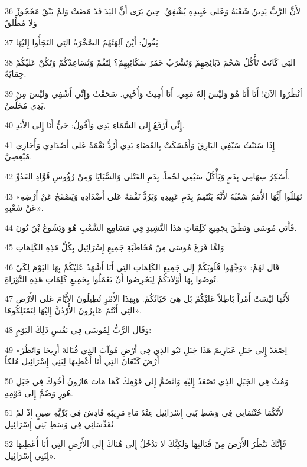 \par 36 لأَنَّ الرَّبَّ يَدِينُ شَعْبَهُ وَعَلى عَبِيدِهِ يُشْفِقُ. حِينَ يَرَى أَنَّ اليَدَ قَدْ مَضَتْ وَلمْ يَبْقَ مَحْجُوزٌ وَلا مُطْلقٌ
\par 37 يَقُولُ: أَيْنَ آلِهَتُهُمُ الصَّخْرَةُ التِي التَجَأُوا إِليْهَا
\par 38 التِي كَانَتْ تَأْكُلُ شَحْمَ ذَبَائِحِهِمْ وَتَشْرَبُ خَمْرَ سَكَائِبِهِمْ؟ لِتَقُمْ وَتُسَاعِدْكُمْ وَتَكُنْ عَليْكُمْ حِمَايَةً.
\par 39 اُنْظُرُوا الآنَ! أَنَا أَنَا هُوَ وَليْسَ إِلهٌ مَعِي. أَنَا أُمِيتُ وَأُحْيِي. سَحَقْتُ وَإِنِّي أَشْفِي وَليْسَ مِنْ يَدِي مُخَلِّصٌ.
\par 40 إِنِّي أَرْفَعُ إِلى السَّمَاءِ يَدِي وَأَقُولُ: حَيٌّ أَنَا إِلى الأَبَدِ.
\par 41 إِذَا سَنَنْتُ سَيْفِي البَارِقَ وَأَمْسَكَتْ بِالقَضَاءِ يَدِي أَرُدُّ نَقْمَةً عَلى أَضْدَادِي وَأُجَازِي مُبْغِضِيَّ.
\par 42 أُسْكِرُ سِهَامِي بِدَمٍ وَيَأْكُلُ سَيْفِي لحْماً. بِدَمِ القَتْلى وَالسَّبَايَا وَمِنْ رُؤُوسِ قُوَّادِ العَدُوِّ.
\par 43 «تَهَللُوا أَيُّهَا الأُمَمُ شَعْبُهُ لأَنَّهُ يَنْتَقِمُ بِدَمِ عَبِيدِهِ وَيَرُدُّ نَقْمَةً عَلى أَضْدَادِهِ وَيَصْفَحُ عَنْ أَرْضِهِ عَنْ شَعْبِهِ».
\par 44 فَأَتَى مُوسَى وَنَطَقَ بِجَمِيعِ كَلِمَاتِ هَذَا النَّشِيدِ فِي مَسَامِعِ الشَّعْبِ هُوَ وَيَشُوعُ بْنُ نُونَ.
\par 45 وَلمَّا فَرَغَ مُوسَى مِنْ مُخَاطَبَةِ جَمِيعِ إِسْرَائِيل بِكُلِّ هَذِهِ الكَلِمَاتِ
\par 46 قَال لهُمْ: «وَجِّهُوا قُلُوبَكُمْ إِلى جَمِيعِ الكَلِمَاتِ التِي أَنَا أَشْهَدُ عَليْكُمْ بِهَا اليَوْمَ لِكَيْ تُوصُوا بِهَا أَوْلادَكُمْ لِيَحْرِصُوا أَنْ يَعْمَلُوا بِجَمِيعِ كَلِمَاتِ هَذِهِ التَّوْرَاةِ.
\par 47 لأَنَّهَا ليْسَتْ أَمْراً بَاطِلاً عَليْكُمْ بَل هِيَ حَيَاتُكُمْ. وَبِهَذَا الأَمْرِ تُطِيلُونَ الأَيَّامَ عَلى الأَرْضِ التِي أَنْتُمْ عَابِرُونَ الأُرْدُنَّ إِليْهَا لِتَمْتَلِكُوهَا».
\par 48 وَقَال الرَّبُّ لِمُوسَى فِي نَفْسِ ذَلِكَ اليَوْمِ:
\par 49 «اِصْعَدْ إِلى جَبَلِ عَبَارِيمَ هَذَا جَبَلِ نَبُو الذِي فِي أَرْضِ مُوآبَ الذِي قُبَالةَ أَرِيحَا وَانْظُرْ أَرْضَ كَنْعَانَ التِي أَنَا أُعْطِيهَا لِبَنِي إِسْرَائِيل مُلكاً
\par 50 وَمُتْ فِي الجَبَلِ الذِي تَصْعَدُ إِليْهِ وَانْضَمَّ إِلى قَوْمِكَ كَمَا مَاتَ هَارُونُ أَخُوكَ فِي جَبَلِ هُورٍ وَضُمَّ إِلى قَوْمِهِ.
\par 51 لأَنَّكُمَا خُنْتُمَانِي فِي وَسَطِ بَنِي إِسْرَائِيل عِنْدَ مَاءِ مَرِيبَةِ قَادِشَ فِي بَرِّيَّةِ صِينٍ إِذْ لمْ تُقَدِّسَانِي فِي وَسَطِ بَنِي إِسْرَائِيل.
\par 52 فَإِنَّكَ تَنْظُرُ الأَرْضَ مِنْ قُبَالتِهَا وَلكِنَّكَ لا تَدْخُلُ إِلى هُنَاكَ إِلى الأَرْضِ التِي أَنَا أُعْطِيهَا لِبَنِي إِسْرَائِيل».

